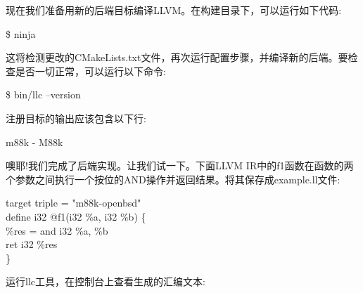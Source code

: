 现在我们准备用新的后端目标编译LLVM。在构建目录下，可以运行如下代码:\par

\begin{tcolorbox}[colback=white,colframe=black]
\$ ninja
\end{tcolorbox}

这将检测更改的CMakeLists.txt文件，再次运行配置步骤，并编译新的后端。要检查是否一切正常，可以运行以下命令:\par

\begin{tcolorbox}[colback=white,colframe=black]
\$ bin/llc –version
\end{tcolorbox}

注册目标的输出应该包含以下行:\par

\begin{tcolorbox}[colback=white,colframe=black]
m88k   \hspace{2cm} - M88k
\end{tcolorbox}

噢耶!我们完成了后端实现。让我们试一下。下面LLVM IR中的f1函数在函数的两个参数之间执行一个按位的AND操作并返回结果。将其保存成example.ll文件:\par

\begin{tcolorbox}[colback=white,colframe=black]
target triple = "m88k-openbsd" \\
define i32 @f1(i32 \%a, i32 \%b) \{ \\
\hspace*{0.5cm}\%res = and i32 \%a, \%b \\
\hspace*{0.5cm}ret i32 \%res \\
\}
\end{tcolorbox}

运行llc工具，在控制台上查看生成的汇编文本:\par

